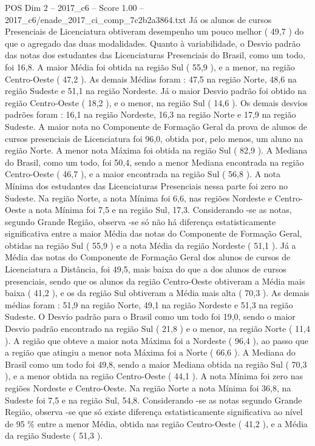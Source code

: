 \begin{textsample}{POS Dim 2 – 2017\_c6 – Score 1.00 – 2017\_c6/enade\_2017\_ci\_comp\_7c2b2a3864.txt}
Já os alunos de cursos Presenciais de Licenciatura obtiveram desempenho um pouco melhor ( 49,7 ) do que o agregado das duas modalidades.
Quanto à variabilidade, o Desvio padrão das notas dos estudantes das Licenciaturas Presenciais do Brasil, como um todo, foi 16,8.
A maior Média foi obtida na região Sul ( 55,9 ), e a menor, na região Centro-Oeste ( 47,2 ).
As demais Médias foram : 47,5 na região Norte, 48,6 na região Sudeste e 51,1 na região Nordeste.
Já o maior Desvio padrão foi obtido na região Centro-Oeste ( 18,2 ), e o menor, na região Sul ( 14,6 ).
Os demais desvios padrões foram : 16,1 na região Nordeste, 16,3 na região Norte e 17,9 na região Sudeste.
A maior nota no Componente de Formação Geral da prova de alunos de cursos presenciais de Licenciatura foi 96,0, obtida por, pelo menos, um aluno na região Norte.
A menor nota Máxima foi obtida na região Sul ( 82,9 ).
A Mediana do Brasil, como um todo, foi 50,4, sendo a menor Mediana encontrada na região Centro-Oeste ( 46,7 ), e a maior encontrada na região Sul ( 56,8 ).
A nota Mínima dos estudantes das Licenciaturas Presenciais nessa parte foi zero no Sudeste.
Na região Norte, a nota Mínima foi 6,6, nas regiões Nordeste e Centro-Oeste a nota Mínima foi 7,5 e na região Sul, 17,3.
Considerando -se as notas, segundo Grande Região, observa -se só não há diferença estatisticamente significativa entre a maior Média das notas do Componente de Formação Geral, obtidas na região Sul ( 55,9 ) e a nota Média da região Nordeste ( 51,1 ).
Já a Média das notas do Componente de Formação Geral dos alunos de cursos de Licenciatura a Distância, foi 49,5, mais baixa do que a dos alunos de cursos presenciais, sendo que os alunos da região Centro-Oeste obtiveram a Média mais baixa ( 41,2 ), e os da região Sul obtiveram a Média mais alta ( 70,3 ).
As demais médias foram : 51,9 na região Norte, 49,1 na região Nordeste e 51,3 na região Sudeste.
O Desvio padrão para o Brasil como um todo foi 19,0, sendo o maior Desvio padrão encontrado na região Sul ( 21,8 ) e o menor, na região Norte ( 11,4 ).
A região que obteve a maior nota Máxima foi a Nordeste ( 96,4 ), ao passo que a região que atingiu a menor nota Máxima foi a Norte ( 66,6 ).
A Mediana do Brasil como um todo foi 49,8, sendo a maior Mediana obtida na região Sul ( 70,3 ), e a menor obtida na região Centro-Oeste ( 44,1 ).
A nota Mínima foi zero nas regiões Nordeste e Centro-Oeste.
Na região Norte a nota Mínima foi 36,8, na Sudeste foi 7,5 e na região Sul, 54,8.
Considerando -se as notas segundo Grande Região, observa -se que só existe diferença estatisticamente significativa ao nível de 95 \% entre a menor Média, obtida nas região Centro-Oeste ( 41,2 ), e a Média da região Sudeste ( 51,3 ).

\end{textsample}
